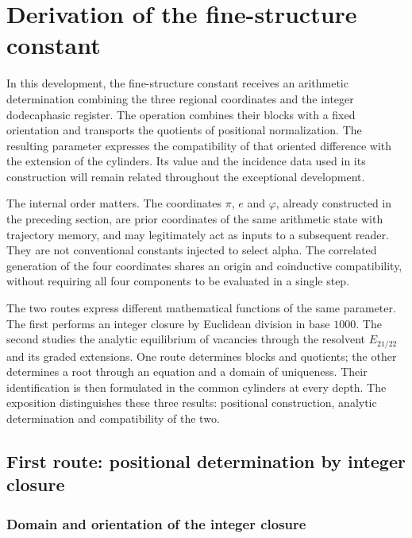 \section{Derivation of the fine-structure constant}
\label{sec:alpha}

In this development, the fine-structure constant receives an arithmetic
determination combining the three regional coordinates and the integer
dodecaphasic register. The operation combines their blocks with a fixed orientation and
transports the quotients of positional normalization. The resulting
parameter expresses the compatibility of that oriented difference with
the extension of the cylinders. Its value and the incidence data
used in its construction will remain related throughout the
exceptional development.

The internal order matters. The coordinates \(\pi\),
\(e\) and \(\varphi\), already constructed in the preceding section, are prior coordinates
of the same arithmetic state with trajectory memory, and may legitimately act as
inputs to a subsequent reader. They are not conventional constants
injected to select alpha. The correlated generation of the four coordinates shares an origin and
coinductive compatibility, without requiring all four
components to be evaluated in a single step.

The two routes express different mathematical functions of the same parameter.
The first performs an integer closure by Euclidean division in base
\(1000\). The second studies the analytic equilibrium of vacancies through
the resolvent \(E_{21/22}\) and its graded extensions. One route
determines blocks and quotients; the other determines a root through an
equation and a domain of uniqueness. Their identification is then formulated
in the common cylinders at every depth. The exposition distinguishes
these three results: positional construction, analytic determination
and compatibility of the two.

\subsection{First route: positional determination by integer closure}
\subsubsection{Domain and orientation of the integer closure}
\label{subsec:alpha-dominio}

